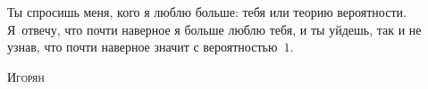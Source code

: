 \documentclass[../TV&MS.tex]{subfiles}
\begin{document}
\epigraph{Ты спросишь меня, кого я люблю больше: тебя или теорию вероятности. Я~отвечу, что почти наверное я больше люблю тебя, и ты уйдешь, так и не узнав, что почти наверное значит с вероятностью~$1$.}%
{\textsc{Игорян}}

\newpage
\end{document}
